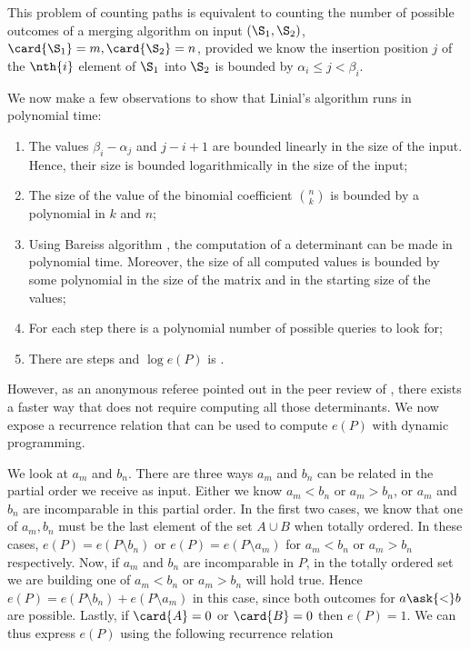 This problem of counting paths is equivalent to counting the number of possible
outcomes of a merging algorithm on input \((\S_1,\S_2)\), \(\card{\S_1} = m,
\card{\S_2} = n\), provided we know the insertion position \(j\) of the
\(\nth{i}\) element of \(\S_1\) into \(\S_2\) is bounded by \(\alpha_i \le j <
\beta_i\).

We now make a few observations to show that Linial's algorithm runs in
polynomial time:

\begin{enumerate}
\item The values \(\beta_i - \alpha_j\) and \(j - i + 1\) are bounded
linearly in the size of the input. Hence, their size is bounded
logarithmically in the size of the input;
\item The size of the value of the binomial coefficient \(\binom{n}{k}\) is
bounded by a polynomial in \(k\) and \(n\);
\item Using Bareiss algorithm \cite{bareiss:1968}, the computation of a
determinant can be made in polynomial time. Moreover, the size of all computed
values is bounded by some polynomial in the size of the matrix and in the starting
size of the values;
\item For each step there is a polynomial number of possible queries to look for;
\item There are  steps and \(\log e(P)\) is .
\end{enumerate}

However, as an anonymous referee pointed out in the peer review of
\citet*{cardinal:2013}, there exists a faster way that does not require computing
all those determinants. We now expose a recurrence relation that can be used
to compute \(e(P)\) with dynamic programming.

We look at \(a_m\) and \(b_n\). There are three ways \(a_m\) and \(b_n\) can be
related in the partial order we receive as input. Either we know \(a_m < b_n\)
or \(a_m > b_n\), or \(a_m\) and \(b_n\) are incomparable in this partial
order. In the first two cases, we know that one of \(a_m,b_n\) must be the last
element of the set \(A \cup B\) when totally ordered. In these cases, \(e(P) =
e(P \setminus b_n)\) or \(e(P) = e(P \setminus a_m)\) for \(a_m < b_n\) or
\(a_m > b_n\) respectively. Now, if \(a_m\) and \(b_n\) are incomparable in
\(P\), in the totally ordered set we are building one of \(a_m < b_n\) or \(a_m
> b_n\) will hold true. Hence \(e(P) = e(P \setminus b_n) + e(P \setminus
a_m)\) in this case, since both outcomes for \(a \ask{<} b\) are possible.
Lastly, if \(\card{A} = 0\) or \(\card{B} = 0\) then \(e(P) = 1\). We can thus
express \(e(P)\) using the following recurrence relation

